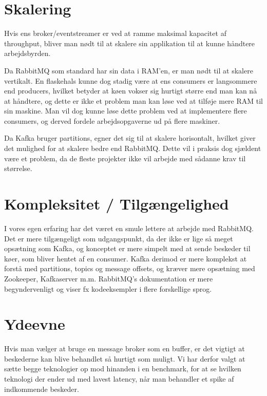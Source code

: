 \documentclass[
]{article}
\begin{document}
\hypertarget{skalering}{%
\section{Skalering}\label{skalering}}

Hvis ens broker/eventstreamer er ved at ramme maksimal kapacitet af
throughput, bliver man nødt til at skalere sin applikation til at kunne
håndtere arbejdsbyrden.

Da RabbitMQ som standard har sin data i RAM'en, er man nødt til at
skalere vertikalt. En flaskehals kunne dog stadig være at ens consumers
er langsommere end producers, hvilket betyder at køen vokser sig hurtigt
større end man kan nå at håndtere, og dette er ikke et problem man kan
løse ved at tilføje mere RAM til sin maskine. Man vil dog kunne løse
dette problem ved at implementere flere consumers, og derved fordele
arbejdsopgaverne ud på flere maskiner.

Da Kafka bruger partitions, egner det sig til at skalere horisontalt,
hvilket giver det mulighed for at skalere bedre end RabbitMQ.\cite{kafka-scaling} Dette vil
i praksis dog sjældent være et problem, da de fleste projekter ikke vil
arbejde med sådanne krav til størrelse.

\hypertarget{kompleksitet-tilguxe6ngelighed}{%
\section{Kompleksitet /
Tilgængelighed}\label{kompleksitet-tilguxe6ngelighed}}

I vores egen erfaring har det været en smule lettere at arbejde med
RabbitMQ. Det er mere tilgængeligt som udgangspunkt, da der ikke er lige
så meget opsætning som Kafka, og konceptet er mere simpelt med at sende
beskeder til køer, som bliver hentet af en consumer. Kafka derimod er
mere komplekst at forstå med partitions, topics og message offsets, og
kræver mere opsætning med Zookeeper, Kafkaserver m.m. RabbitMQ's
dokumentation er mere begyndervenligt og viser fx kodeeksempler i flere
forskellige sprog.\cite{rabbit-guide}\cite{kafka-guide}


\hypertarget{ydeevne}{%
\section{Ydeevne}\label{ydeevne}}

Hvis man vælger at bruge en message broker som en buffer, er det vigtigt
at beskederne kan blive behandlet så hurtigt som muligt. Vi har derfor
valgt at sætte begge teknologier op mod hinanden i en benchmark, for at
se hvilken teknologi der ender ud med lavest latency, når man behandler
et spike af indkommende beskeder.
\end{document}
